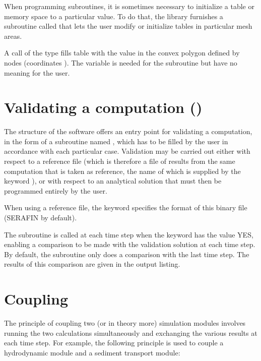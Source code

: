 When programming  subroutines, it is sometimes necessary to
initialize a table or memory space to a particular value. To do that, the \bief
library furnishes a subroutine called  that lets the user modify or
initialize tables in particular mesh areas.

A call of the type  fills
table  with the  value in the convex polygon defined by
 nodes (coordinates ).
The variable  is needed for the  subroutine
but have no meaning for the user.


\section{Validating a computation ()}

The structure of the  software offers an entry point for validating a
computation, in the form of a subroutine named , which has to
be filled by the user in accordance with each particular case.
Validation may be carried out either with respect to a reference file (which is
therefore a file of results from the same computation that is taken as reference,
the name of which is supplied by the keyword ), or with
respect to an analytical solution that must then be programmed entirely by the user.

When using a reference file, the keyword 
specifies the format of this binary file (SERAFIN by default).

The  subroutine is called at each time step when the keyword
 has the value YES, enabling a comparison to be made with
the validation solution at each time step. By default, the 
subroutine only does a comparison with the last time step. The results of this
comparison are given in the output listing.


\section{Coupling}

The principle of coupling two (or in theory more) simulation modules involves
running the two calculations simultaneously and exchanging the various results
at each time step. For example, the following principle is used to couple a
hydrodynamic module and a sediment transport module:

